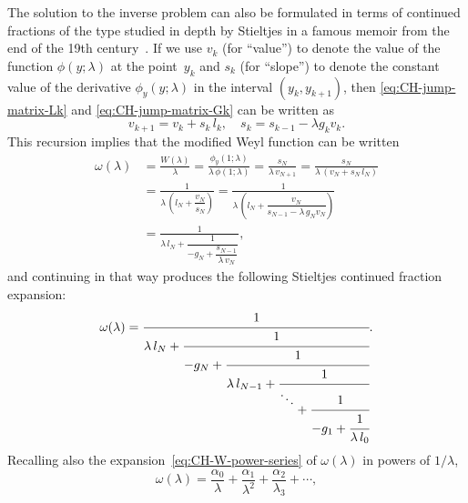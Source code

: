 \documentclass[10pt,a4paper]{article} \pdfoutput=1 
\begin{document}
\begin{remark}
  The solution to the inverse problem can also be formulated in terms of
  continued fractions of the type studied in depth by Stieltjes
  in a famous memoir from the end of the
  19th century~\cite{stieltjes:1894:recherches-fractions-continues-1,stieltjes:1895:recherches-fractions-continues-2}.
  If we use $v_k$ (for ``value'')
  to denote the value of the function $\phi(y;\lambda)$ at the point~$y_k$
  and $s_k$ (for ``slope'') to denote the constant value
  of the derivative $\phi_y(y;\lambda)$ in the interval $(y_{k},y_{k+1})$,
  then \eqref{eq:CH-jump-matrix-Lk} and \eqref{eq:CH-jump-matrix-Gk} can be written as
  \begin{equation}
    \label{eq:CH-value-slope-recursion}
    v_{k+1} = v_{k} + s_{k} \, l_{k}
    ,\quad
    s_{k} = s_{k-1} - \lambda g_{k} v_{k}
    .
  \end{equation}
  This recursion implies that the modified Weyl function can be written
  \begin{equation*}
    \begin{split}
      \omega(\lambda)
      &
      = \frac{W(\lambda)}{\lambda}
      = \frac{\phi_y(1;\lambda)}{\lambda \, \phi(1;\lambda)}
      = \frac{s_N}{\lambda \, v_{N+1}}
      = \frac{s_N}{\lambda \, (v_N + s_N \, l_N)}
      \\ &
      = \frac{1}{\lambda \, \left( l_N + \dfrac{v_N}{s_N} \right)}
      = \frac{1}{\lambda \, \left( l_N + \dfrac{v_N}{s_{N-1} - \lambda \, g_N v_N} \right)}
      \\ &
      = \frac{1}{\lambda \, l_N + \dfrac{1}{-g_N + \dfrac{s_{N-1}}{\lambda \, v_N}}}
      ,
    \end{split}
  \end{equation*}
  and continuing in that way produces the following Stieltjes continued fraction expansion:
  \begin{equation}
    \label{eq:CH-W-cfrac}
    \omega(\lambda)
    = \cfrac{1}{\lambda \, l_N +
      \cfrac{1}{-g_N +
        \cfrac{1}{\lambda \, l_{N-1} +
          \cfrac{1}{\raisebox{1.5ex}{$\ddots$} +
            \cfrac{1}{-g_1 +
              \cfrac{1}{\lambda \, l_0}
            }}}}}
    .
  \end{equation}
  Recalling also the expansion~\eqref{eq:CH-W-power-series} of $\omega(\lambda)$
  in powers of $1/\lambda$,
  \begin{equation*}
    \omega(\lambda)
    = \frac{\alpha_0}{\lambda} + \frac{\alpha_1}{\lambda^2} + \frac{\alpha_2}{\lambda_3} + \dotsb
    ,
  \end{equation*}

\end{remark}
\end{document}
